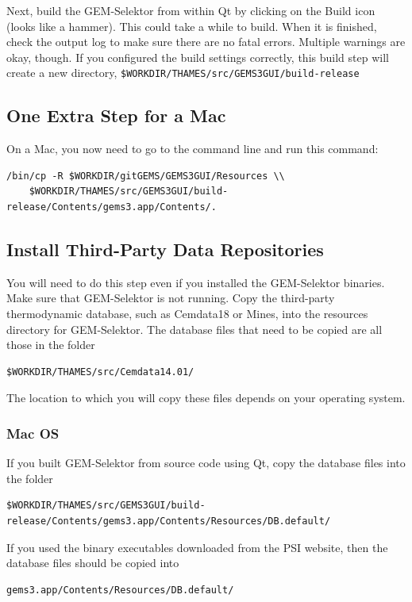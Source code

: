 \documentclass{article}
\begin{document}
Next, build the GEM-Selektor from within Qt by clicking on the Build icon (looks like a hammer).
This could take a while to build.  When it is finished, check the output log to make sure there
are no fatal errors.  Multiple warnings are okay, though.  If you configured the build settings
correctly, this build step will create a new directory, \verb!$WORKDIR/THAMES/src/GEMS3GUI/build-release!

\subsection{One Extra Step for a Mac}
On a Mac, you now need to go to the command line and run this command:
\begin{verbatim}
/bin/cp -R $WORKDIR/gitGEMS/GEMS3GUI/Resources \\
    $WORKDIR/THAMES/src/GEMS3GUI/build-release/Contents/gems3.app/Contents/.
\end{verbatim}

\subsection{Install Third-Party Data Repositories}
You will need to do this step even if you installed the GEM-Selektor binaries.
Make sure that GEM-Selektor is not running.
Copy the third-party thermodynamic database, such as Cemdata18 or Mines, into
the resources directory for GEM-Selektor.  The database files that need to be
copied are all those in the folder
\begin{verbatim}
$WORKDIR/THAMES/src/Cemdata14.01/
\end{verbatim}

The location to which you will copy these files depends on your operating
system.
\subsubsection{Mac OS}
If you built GEM-Selektor from source code using Qt, copy the database files
into the folder 
\begin{verbatim}
$WORKDIR/THAMES/src/GEMS3GUI/build-release/Contents/gems3.app/Contents/Resources/DB.default/
\end{verbatim}

If you used the binary executables downloaded from the PSI website, then the
database files should be copied into
\begin{verbatim}
gems3.app/Contents/Resources/DB.default/
\end{verbatim}
\end{document}

